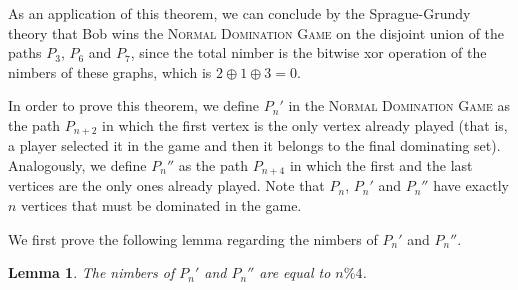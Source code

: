 \documentclass[12pt]{article}
\newtheorem{lemma}[theorem]{Lemma}
\DeclareMathOperator{\mex}{mex}
\newcommand{\xor}{\oplus}
\begin{document}
As an application of this theorem, we can conclude by the Sprague-Grundy theory that Bob wins the \textsc{Normal Domination Game} on the disjoint union of the paths $P_3$, $P_6$ and $P_7$, since the total nimber is the bitwise xor operation of the nimbers of these graphs, which is $2\xor 1\xor 3=0$.


In order to prove this theorem, we define $P_n'$ in the \textsc{Normal Domination Game} as the path $P_{n+2}$ in which the first vertex is the only vertex already played (that is, a player selected it in the game and then it belongs to the final dominating set). Analogously, we define $P_n''$ as the path $P_{n+4}$ in which the first and the last vertices are the only ones already played. Note that $P_n$, $P_n'$ and $P_n''$ have exactly $n$ vertices that must be dominated in the game.

We first prove the following lemma regarding the nimbers of $P_n'$ and $P_n''$.

\begin{lemma}\label{lemma1}
The nimbers of $P_n'$ and $P_n''$ are equal to $n\% 4$.
\end{lemma}
\end{document}
